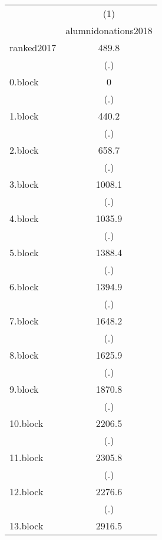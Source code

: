 {
\def\sym#1{\ifmmode^{#1}\else\(^{#1}\)\fi}
\begin{tabular}{l*{1}{c}}
\hline\hline
            &\multicolumn{1}{c}{(1)}\\
            &\multicolumn{1}{c}{alumnidonations2018}\\
\hline
ranked2017  &       489.8         \\
            &         (.)         \\
[1em]
0.block     &           0         \\
            &         (.)         \\
[1em]
1.block     &       440.2         \\
            &         (.)         \\
[1em]
2.block     &       658.7         \\
            &         (.)         \\
[1em]
3.block     &      1008.1         \\
            &         (.)         \\
[1em]
4.block     &      1035.9         \\
            &         (.)         \\
[1em]
5.block     &      1388.4         \\
            &         (.)         \\
[1em]
6.block     &      1394.9         \\
            &         (.)         \\
[1em]
7.block     &      1648.2         \\
            &         (.)         \\
[1em]
8.block     &      1625.9         \\
            &         (.)         \\
[1em]
9.block     &      1870.8         \\
            &         (.)         \\
[1em]
10.block    &      2206.5         \\
            &         (.)         \\
[1em]
11.block    &      2305.8         \\
            &         (.)         \\
[1em]
12.block    &      2276.6         \\
            &         (.)         \\
[1em]
13.block    &      2916.5         \\

\end{tabular}}
